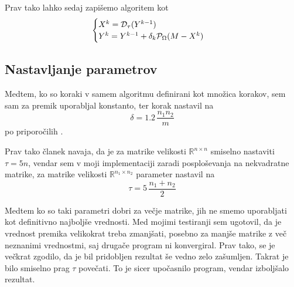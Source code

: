 Prav tako lahko sedaj zapišemo algoritem kot \cite{CCS}
\[
    \begin{cases}
        X^k = \mathcal{D}_\tau(Y^{k-1}) \\
        Y^k = Y^{k-1} + \delta_k \mathcal{P}_\Omega(M - X^k) 
    \end{cases}
\]

\subsection{Nastavljanje parametrov}
Medtem, ko so koraki v samem algoritmu definirani kot množica korakov, 
sem sam za premik uporabljal konstanto, ter korak nastavil na 
\[
    \delta = 1.2\, \dfrac{n_1 n_2}{m}
\] po priporočilih \cite{CCS}. 

Prav tako članek navaja, da je za matrike velikosti $\mathbb{R}^{n \times n}$ smiselno nastaviti $\tau = 5n$, vendar sem v moji implementaciji zaradi posploševanja na nekvadratne matrike, za matrike velikosti $\mathbb{R}^{n_1 \times n_2}$ parameter nastavil na
\[
    \tau = 5\, \frac{n_1+n_2}{2}
\]

Medtem ko so taki parametri dobri za večje matrike, jih ne smemo uporabljati kot definitivno najboljše vrednosti. Med mojimi testiranji sem ugotovil, da je vrednost premika velikokrat treba zmanjšati, posebno za manjše matrike z več neznanimi vrednostmi, saj drugače program ni konvergiral. Prav tako, se je večkrat zgodilo, da je bil pridobljen rezultat še vedno zelo zašumljen. Takrat je bilo smiselno prag $\tau$ povečati. To je sicer upočasnilo program, vendar izboljšalo rezultat.